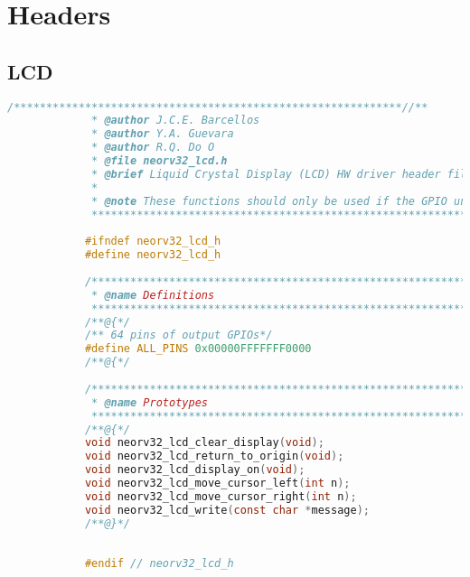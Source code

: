 %
%
%
%
%


\chapter{Headers}

    \section{LCD}\label{.h:lcd}
        \begin{lstlisting}[style=mystyle_c, language=c, breaklines]
            /************************************************************//**
             * @author J.C.E. Barcellos
             * @author Y.A. Guevara
             * @author R.Q. Do O
             * @file neorv32_lcd.h
             * @brief Liquid Crystal Display (LCD) HW driver header file.
             *
             * @note These functions should only be used if the GPIO unit was synthesized (IO_GPIO_EN = true).
             ***************************************************************/
            
            #ifndef neorv32_lcd_h
            #define neorv32_lcd_h
            
            /************************************************************//**
             * @name Definitions
             ***************************************************************/
            /**@{*/
            /** 64 pins of output GPIOs*/
            #define ALL_PINS 0x00000FFFFFFF0000
            /**@{*/
            
            /************************************************************//**
             * @name Prototypes
             ***************************************************************/
            /**@{*/
            void neorv32_lcd_clear_display(void);
            void neorv32_lcd_return_to_origin(void);
            void neorv32_lcd_display_on(void);
            void neorv32_lcd_move_cursor_left(int n);
            void neorv32_lcd_move_cursor_right(int n);
            void neorv32_lcd_write(const char *message);
            /**@}*/
            
            
            #endif // neorv32_lcd_h      
        \end{lstlisting}


